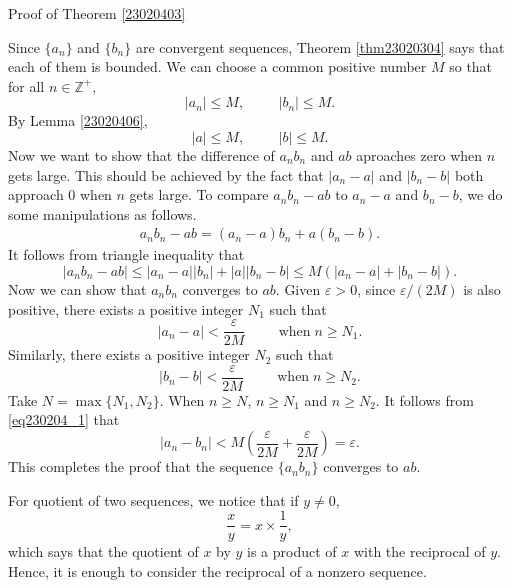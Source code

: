 \begin{myproof}{\linkt Proof of Theorem \ref{23020403}\linko}
 
Since $\{a_n\}$ and $\{b_n\}$ are  convergent sequences, Theorem \ref{thm23020304} says that each of them is bounded. We can choose a common positive number $M$ so that for all $n\in\mathbb{Z}^+$,
\[|a_n|\leq M,\hspace{1cm}|b_n|\leq M.\]By Lemma \ref{23020406}, 
\[|a|\leq M,\hspace{1cm}|b|\leq M.\]Now we want to show that the difference of $a_nb_n$ and $ab$ aproaches zero when $n$ gets large. This should be achieved by the fact that $|a_n-a|$ and $|b_n-b|$ both approach 0 when $n$ gets large. To compare $a_nb_n-ab$ to $a_n-a$ and $b_n-b$, we do some manipulations as follows.
\begin{align*}
a_nb_n-ab=(a_n-a)b_n+a(b_n-b).
\end{align*}It follows from triangle inequality that
\begin{equation}\label{eq230204_1}|a_nb_n-ab|\leq |a_n-a||b_n|+|a||b_n-b|\leq M\left(|a_n-a|+|b_n-b|\right).\end{equation}
Now we can show that $a_nb_n$ converges to $ab$. Given $\varepsilon>0$, since $\varepsilon/(2M)$ is also positive, there exists a positive integer $N_1$ such that
\[|a_n-a|<\frac{\varepsilon}{2M}\hspace{1cm}\text{when}\;n\geq N_1.\]Similarly, 
there exists a positive integer $N_2$ such that \bp
\[|b_n-b|<\frac{\varepsilon}{2M}\hspace{1cm}\text{when}\;n\geq N_2.\]
 Take $N=\max\{N_1, N_2\}$. When $n\geq N$, $n\geq N_1$ and $n\geq N_2$. It follows from 
\eqref{eq230204_1} that
\[|a_n-b_n|<M\left(\frac{\varepsilon}{2M}+\frac{\varepsilon}{2M}\right)=\varepsilon.\]
This completes the proof that the sequence $\{a_nb_n\}$ converges to $ab$.
\end{myproof}
 

For quotient of two  sequences, we notice that if $y\neq 0$,
\[\frac{x}{y}=x\times \frac{1}{y},\]which says that the quotient of $x$ by $y$ is a product of $x$ with the reciprocal of $y$. Hence, it is enough to consider the reciprocal of a nonzero sequence.

